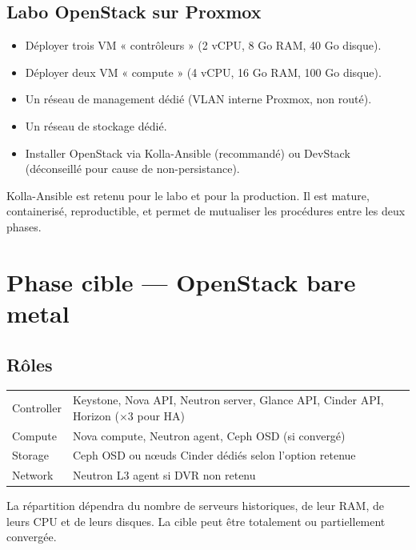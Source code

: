 \subsection{Labo OpenStack sur Proxmox}
\begin{itemize}
  \item Déployer trois VM « contrôleurs » (2 vCPU, 8 Go RAM, 40 Go disque).
  \item Déployer deux VM « compute » (4 vCPU, 16 Go RAM, 100 Go disque).
  \item Un réseau de management dédié (VLAN interne Proxmox, non routé).
  \item Un réseau de stockage dédié.
  \item Installer OpenStack via Kolla-Ansible (recommandé) ou DevStack (déconseillé pour cause de non-persistance).
\end{itemize}

\begin{infobox}
Kolla-Ansible est retenu pour le labo et pour la production. Il est mature, containerisé, reproductible, et permet de mutualiser les procédures entre les deux phases.
\end{infobox}

\section{Phase cible — OpenStack bare metal}
\subsection{Rôles}
\begin{xltabular}{\textwidth}{@{}lX@{}}
\toprule
{} &  \\
\midrule
\endhead
\bottomrule
\endfoot
\bottomrule
\endlastfoot
Controller & Keystone, Nova API, Neutron server, Glance API, Cinder API, Horizon ($\times 3$ pour HA) \\
Compute    & Nova compute, Neutron agent, Ceph OSD (si convergé) \\
Storage    & Ceph OSD ou nœuds Cinder dédiés selon l'option retenue \\
Network    & Neutron L3 agent si DVR non retenu \\

\end{xltabular}

\begin{todobox}
La répartition dépendra du nombre de serveurs historiques, de leur RAM, de leurs CPU et de leurs disques. La cible peut être totalement ou partiellement convergée.
\end{todobox}